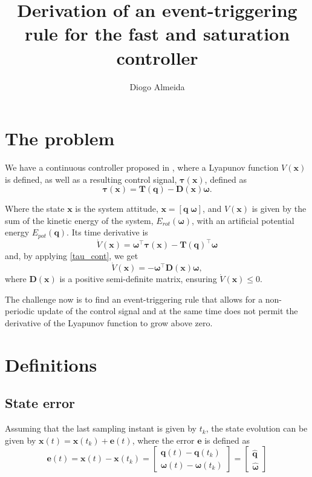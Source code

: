 \documentclass{article}
\begin{document}
	\title{Derivation of an event-triggering rule for the fast and saturation controller}
	\author{Diogo Almeida}
	\maketitle	
	
	\section{The problem}
		We have a continuous controller proposed in \cite{lohmann_attitude}, where a Lyapunov function $V(\mathbf{x})$ is defined, as well as a resulting control signal, $\boldsymbol \tau(\mathbf{x})$, defined as
		\begin{equation}
			\boldsymbol \tau(\mathbf{x}) = \mathbf{T(q)} - \mathbf{D(x)} \boldsymbol \omega.
			\label{tau_cont}
		\end{equation}
		
		Where the state $\mathbf{x}$ is the system attitude, $\mathbf{x} = \left [\mathbf{q} \; \boldsymbol \omega \right]$, and $V(\mathbf{x})$ is given by the sum of the kinetic energy of the system, $E_{rot}(\boldsymbol \omega)$, with an artificial potential energy $E_{pot}(\mathbf{q})$. Its time derivative is
		\[
			\dot V(\mathbf{x}) = \boldsymbol \omega^\top \boldsymbol \tau(\mathbf{x}) - \mathbf{T(q)}^\top \boldsymbol \omega
		\]
		and, by applying \eqref{tau_cont}, we get
		\begin{equation}
			\dot V(\mathbf{x}) = -\boldsymbol \omega^\top \mathbf{D(x)} \boldsymbol \omega,
			\label{vdot_cont}
		\end{equation}
		where $\mathbf{D(x)}$ is a positive semi-definite matrix, ensuring $\dot V(\mathbf{x}) \leq 0$.
		
		The challenge now is to find an event-triggering rule that allows for a non-periodic update of the control signal and at the same time does not permit the derivative of the Lyapunov function to grow above zero.
	\section{Definitions}
		\subsection{State error}
			Assuming that the last sampling instant is given by $t_k$, the state evolution can be given by $\mathbf{x}(t) = \mathbf{x}(t_k) + \mathbf{e}(t)$, where the error $\mathbf{e}$ is defined as
			\begin{equation}
				\mathbf{e}(t) = \mathbf{x}(t) - \mathbf{x}(t_k) = \begin{bmatrix}
											\mathbf{q}(t) - \mathbf{q}(t_k)\\
											\boldsymbol \omega(t) - \boldsymbol \omega(t_k)
										  \end{bmatrix} =			
										 \begin{bmatrix}
											 \mathbf{\hat{q}} \\
											  \hat{\boldsymbol \omega}
										  \end{bmatrix}
				\label{error}
			\end{equation}
		
\end{document}
